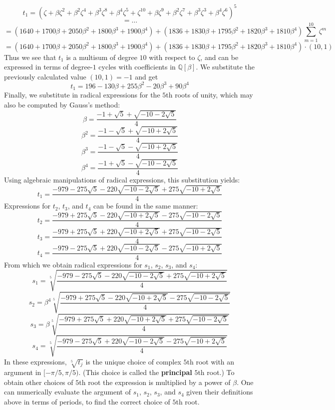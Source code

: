 \documentclass{article}
\begin{document}
        $$ t_1 = (\zeta + \beta \zeta^2 + \beta^2 \zeta^4 + \beta^3 \zeta^8 + \beta^4 \zeta^5 + \zeta^{10} + \beta \zeta^9 + \beta^2 \zeta^7 + \beta^3 \zeta^3 + \beta^4 \zeta^6)^5 $$
        $$ = \dots $$
        $$ = (1640 + 1700\beta + 2050\beta^2 + 1800\beta^3 + 1900\beta^4) + (1836 + 1830\beta + 1795\beta^2 + 1820\beta^3 + 1810\beta^4) \sum_{m = 1}^{10} \zeta^m $$
        $$ = (1640 + 1700\beta + 2050\beta^2 + 1800\beta^3 + 1900\beta^4) + (1836 + 1830\beta + 1795\beta^2 + 1820\beta^3 + 1810\beta^4) \cdot (10, 1) $$
        Thus we see that $ t_1 $ is a multisum of degree $ 10 $ with respect to $ \zeta $, and can be expressed in terms of degree-$ 1 $ cycles with coefficients in $ \mathbb{Q}[\beta] $. We substitute the previously calculated value $ (10, 1) = -1 $ and get
        $$ t_1 = 196 - 130\beta + 255\beta^2 - 20\beta^3 + 90\beta^4 $$
        Finally, we substitute in radical expressions for the $ 5 $th roots of unity, which may also be computed by Gauss's method:
        $$ \beta = \frac{-1+\sqrt{5}+\sqrt{-10-2 \sqrt{5}}}{4} $$
        $$ \beta^2 = \frac{-1-\sqrt{5}+\sqrt{-10+2 \sqrt{5}}}{4} $$
        $$ \beta^3 = \frac{-1-\sqrt{5}-\sqrt{-10+2 \sqrt{5}}}{4} $$
        $$ \beta^4 = \frac{-1+\sqrt{5}-\sqrt{-10-2 \sqrt{5}}}{4} $$
        Using algebraic manipulations of radical expressions, this substitution yields:
        $$ t_1 = \frac{-979-275 \sqrt{5}-220 \sqrt{-10-2 \sqrt{5}}+275 \sqrt{-10+2 \sqrt{5}}}{4} $$
        Expressions for $ t_2 $, $ t_3 $, and $ t_4 $ can be found in the same manner:
        $$ t_2 = \frac{-979+275 \sqrt{5}-220 \sqrt{-10+2 \sqrt{5}}-275 \sqrt{-10-2 \sqrt{5}}}{4} $$
        $$ t_3 = \frac{-979+275 \sqrt{5}+220 \sqrt{-10+2 \sqrt{5}}+275 \sqrt{-10-2 \sqrt{5}}}{4} $$
        $$ t_4 = \frac{-979-275 \sqrt{5}+220 \sqrt{-10-2 \sqrt{5}}-275 \sqrt{-10+2 \sqrt{5}}}{4} $$
        From which we obtain radical expressions for $ s_1 $, $ s_2 $, $ s_3 $, and $ s_4 $:
        $$ s_1 = \sqrt[5]{\frac{-979-275 \sqrt{5}-220 \sqrt{-10-2 \sqrt{5}}+275 \sqrt{-10+2 \sqrt{5}}}{4}} $$
        $$ s_2 = \beta^4 \sqrt[5]{\frac{-979+275 \sqrt{5}-220 \sqrt{-10+2 \sqrt{5}}-275 \sqrt{-10-2 \sqrt{5}}}{4}} $$
        $$ s_3 = \beta \sqrt[5]{\frac{-979+275 \sqrt{5}+220 \sqrt{-10+2 \sqrt{5}}+275 \sqrt{-10-2 \sqrt{5}}}{4}} $$
        $$ s_4 = \sqrt[5]{\frac{-979-275 \sqrt{5}+220 \sqrt{-10-2 \sqrt{5}}-275 \sqrt{-10+2 \sqrt{5}}}{4}} $$
        In these expressions, $ \sqrt[5]{t_j} $ is the unique choice of complex $ 5 $th root with an argument in $ [-\pi/5, \pi/5) $. (This choice is called the \textbf{principal} $ 5 $th root.) To obtain other choices of $ 5 $th root the expression is multiplied by a power of $ \beta $. One can numerically evaluate the argument of $ s_1 $, $ s_2 $, $ s_3 $, and $ s_4 $ given their definitions above in terms of periods, to find the correct choice of $ 5 $th root.\\
\end{document}
